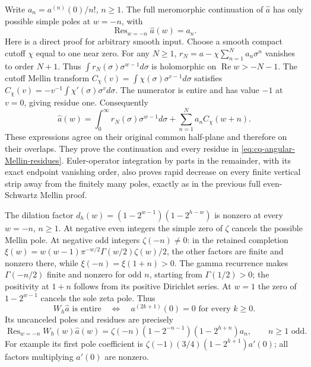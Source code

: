 Write $a_n=a^{(n)}(0)/n!$, $n\geq1$. The full meromorphic
continuation of $\widehat a$ has only possible simple poles at
$w=-n$, with
\begin{equation}
 \operatorname{Res}_{w=-n}\widehat a(w)=a_n.
 \label{eq:cq-angular-Mellin-residues}
\end{equation}
Here is a direct proof for arbitrary smooth input. Choose a smooth
compact cutoff $\chi$ equal to one near zero. For any $N\geq1$,
$r_N=a-\chi\sum_{n=1}^Na_n\sigma^n$ vanishes to order $N+1$.
Thus $\int r_N(\sigma)\sigma^{w-1}d\sigma$ is holomorphic on
$\operatorname{Re}w>-N-1$. The cutoff Mellin transform
$C_\chi(v)=\int\chi(\sigma)\sigma^{v-1}d\sigma$ satisfies
$C_\chi(v)=-v^{-1}\int\chi'(\sigma)\sigma^v d\sigma$.
The numerator is entire and has value $-1$ at $v=0$, giving
residue one. Consequently
\[
 \widehat a(w)=
 \int_0^\infty r_N(\sigma)\sigma^{w-1}d\sigma
                  +\sum_{n=1}^Na_nC_\chi(w+n).
\]
These expressions agree on their original common half-plane and
therefore on their overlaps. They prove the continuation and every
residue in \eqref{eq:cq-angular-Mellin-residues}. Euler-operator
integration by parts in the remainder, with its exact endpoint
vanishing order, also proves rapid decrease on every finite
vertical strip away from the finitely many poles, exactly as in
the previous full even-Schwartz Mellin proof.

The dilation factor
$d_h(w)=(1-2^{w-1})(1-2^{h-w})$ is nonzero at every $w=-n$,
$n\geq1$. At negative even integers the simple zero of $\zeta$
cancels the possible Mellin pole. At negative odd integers
$\zeta(-n)\ne0$: in the retained completion
$\xi(w)=w(w-1)\pi^{-w/2}\Gamma(w/2)\zeta(w)/2$, the other
factors are finite and nonzero there, while
$\xi(-n)=\xi(1+n)>0$. The gamma recurrence makes
$\Gamma(-n/2)$ finite and nonzero for odd $n$, starting from
$\Gamma(1/2)>0$; the positivity at $1+n$ follows from its
positive Dirichlet series. At $w=1$ the zero of $1-2^{w-1}$
cancels the sole zeta pole. Thus
\begin{equation}
 W_h\widehat a\text{ is entire}
 \quad\Longleftrightarrow\quad
 a^{(2k+1)}(0)=0\text{ for every }k\geq0.
 \label{eq:cq-angular-direct-entire-domain}
\end{equation}
Its uncanceled poles and residues are precisely
\[
 \operatorname{Res}_{w=-n}W_h(w)\widehat a(w)
 =\zeta(-n)(1-2^{-n-1})(1-2^{h+n})a_n,
 \qquad n\geq1\text{ odd}.
\]
For example its first pole coefficient is
$\zeta(-1)(3/4)(1-2^{h+1})a'(0)$; all factors multiplying
$a'(0)$ are nonzero.

